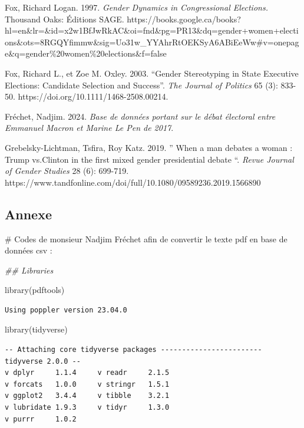 \documentclass[
  letterpaper,
  DIV=11,
  numbers=noendperiod]{scrartcl}
\newenvironment{Shaded}{\begin{snugshade}}{\end{snugshade}}
\newcommand{\CommentTok}[1]{\textcolor[rgb]{0.37,0.37,0.37}{#1}}
\newcommand{\DocumentationTok}[1]{\textcolor[rgb]{0.37,0.37,0.37}{\textit{#1}}}
\newcommand{\FunctionTok}[1]{\textcolor[rgb]{0.28,0.35,0.67}{#1}}
\newcommand{\NormalTok}[1]{\textcolor[rgb]{0.00,0.23,0.31}{#1}}
\begin{document}
Fox, Richard Logan. 1997. \emph{Gender Dynamics in Congressional
Elections.} Thousand Oaks: Éditions SAGE.
https://books.google.ca/books?hl=en\&lr=\&id=x2w1BfJwRkAC\&oi=fnd\&pg=PR13\&dq=gender+women+elections\&ots=8RGQYfimmw\&sig=Uo31w\_YYAhrRtOEKSyA6ABiEeWw\#v=onepage\&q=gender\%20women\%20elections\&f=false

Fox, Richard L., et Zoe M. Oxley. 2003. ``Gender Stereotyping in State
Executive Elections: Candidate Selection and Success''. \emph{The
Journal of Politics} 65 (3): 833-50.
https://doi.org/10.1111/1468-2508.00214.

Fréchet, Nadjim. 2024. \emph{Base de données portant sur le débat
électoral entre Emmanuel Macron et Marine Le Pen de 2017}.

Grebelsky-Lichtman, Tsfira, Roy Katz. 2019. '' When a man debates a
woman : Trump vs.Clinton in the first mixed gender presidential debate
``. \emph{Revue Journal of Gender Studies} 28 (6): 699-719.
https://www.tandfonline.com/doi/full/10.1080/09589236.2019.1566890

\hypertarget{annexe}{%
\subsection{Annexe}\label{annexe}}

\begin{Shaded}
\begin{Highlighting}[]
\CommentTok{\# Codes de monsieur Nadjim Fréchet afin de convertir le texte pdf en base de données csv : }

\DocumentationTok{\#\# Libraries}

\FunctionTok{library}\NormalTok{(pdftools)}
\end{Highlighting}
\end{Shaded}

\begin{verbatim}
Using poppler version 23.04.0
\end{verbatim}

\begin{Shaded}
\begin{Highlighting}[]
\FunctionTok{library}\NormalTok{(tidyverse)}
\end{Highlighting}
\end{Shaded}

\begin{verbatim}
-- Attaching core tidyverse packages ------------------------ tidyverse 2.0.0 --
v dplyr     1.1.4     v readr     2.1.5
v forcats   1.0.0     v stringr   1.5.1
v ggplot2   3.4.4     v tibble    3.2.1
v lubridate 1.9.3     v tidyr     1.3.0
v purrr     1.0.2     
\end{verbatim}
\end{document}

